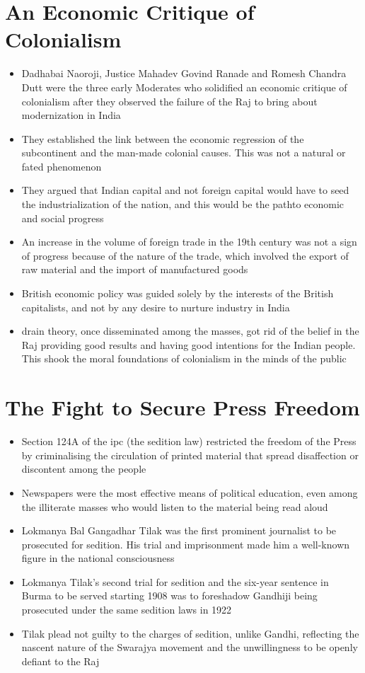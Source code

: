 \section{An Economic Critique of Colonialism}
\begin{itemize}
    \item Dadhabai Naoroji, Justice Mahadev Govind Ranade and Romesh Chandra Dutt were the three early Moderates who solidified an economic critique of colonialism after they observed the failure of the Raj to bring about modernization in India
    \item They established the link between the economic regression of the subcontinent and the man-made colonial causes. This was not a natural or fated phenomenon
    \item They argued that Indian capital and not foreign capital would have to seed the industrialization of the nation, and this would be the pathto economic and social progress
    \item An increase in the volume of foreign trade in the 19th century was not a sign of progress because of the nature of the trade, which involved the export of raw material and the import of manufactured goods
    \item British economic policy was guided solely by the interests of the British capitalists, and not by any desire to nurture industry in India
    \item \Gls{drain theory}, once disseminated among the masses, got rid of the belief in the Raj providing good results and having good intentions for the Indian people. This shook the moral foundations of colonialism in the minds of the public
\end{itemize}

\section{The Fight to Secure Press Freedom}
\begin{itemize}
    \item Section 124A of the \gls{ipc} (the sedition law) restricted the freedom of the Press by criminalising the circulation of printed material that spread disaffection or discontent among the people
    \item Newspapers were the most effective means of political education, even among the illiterate masses who would listen to the material being read aloud
    \item Lokmanya Bal Gangadhar Tilak was the first prominent journalist to be prosecuted for sedition. His trial and imprisonment made him a well-known figure in the national consciousness
    \item Lokmanya Tilak's second trial for sedition and the six-year sentence in Burma to be served starting 1908 was to foreshadow Gandhiji being prosecuted under the same sedition laws in 1922
    \item Tilak plead not guilty to the charges of sedition, unlike Gandhi, reflecting the nascent nature of the Swarajya movement and the unwillingness to be openly defiant to the Raj
\end{itemize}

